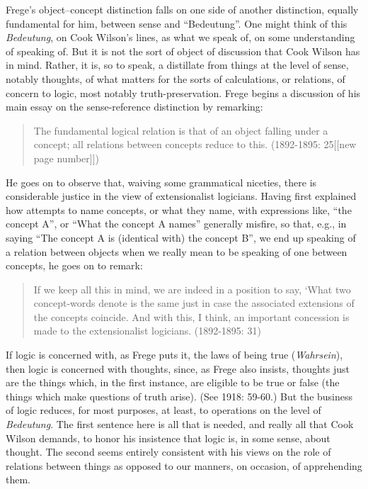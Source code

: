 Frege’s object--concept distinction falls on one side of another distinction, equally fundamental for him, between sense and ``Bedeutung''. One might think of this \emph{Bedeutung}, on Cook Wilson's lines, as what we speak of, on some understanding of speaking of. But it is not the sort of object of discussion that Cook Wilson has in mind. Rather, it is, so to speak, a distillate from things at the level of sense, notably thoughts, of what matters for the sorts of calculations, or relations, of concern to logic, most notably truth-preservation. Frege begins a discussion of his main essay on the sense-reference distinction by remarking:
\begin{quote}
	The fundamental logical relation is that of an object falling under a concept; all relations between concepts reduce to this. (1892-1895: 25[[new page number]])
\end{quote}
He goes on to observe that, waiving some grammatical niceties, there is considerable justice in the view of extensionalist logicians. Having first explained how attempts to name concepts, or what they name, with expressions like, ``the concept A'', or ``What the concept A names'' generally misfire, so that, e.g., in saying ``The concept A is (identical with) the concept B'', we end up speaking of a relation between objects when we really mean to be speaking of one between concepts, he goes on to remark:
\begin{quote}
	If we keep all this in mind, we are indeed in a position to say,  ‘What two concept-words denote is the same just in case the associated extensions of the concepts coincide. And with this, I think, an important concession is made to the extensionalist logicians. (1892-1895: 31)
\end{quote}
If logic is concerned with, as Frege puts it, the laws of being true (\emph{Wahrsein}), then logic is concerned with thoughts, since, as Frege also insists, thoughts just are the things which, in the first instance, are eligible to be true or false (the things which make questions of truth arise). (See 1918: 59-60.) But the business of logic reduces, for most purposes, at least, to operations on the level of \emph{Bedeutung}. The first sentence here is all that is needed, and really all that Cook Wilson demands, to honor his insistence that logic is, in some sense, about thought. The second seems entirely consistent with his views on the role of relations between things as opposed to our manners, on occasion, of apprehending them.

